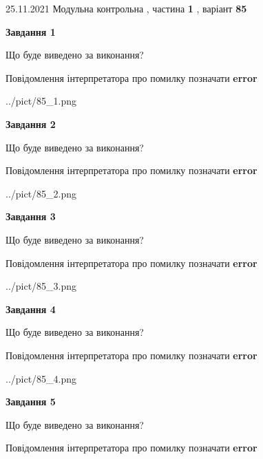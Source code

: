 \documentclass[10pt, ukrainian]{article}
\begin{document}
{25.11.2021 Модульна контрольна , частина \textbf { 1 }, варіант  \No \textbf { 85 }\par}
{
\begin {large}

{\begin {center}\textbf{Завдання 1}\end {center}}\par
Що буде виведено за виконання? \par
Повідомлення інтерпретатора про помилку позначати \textbf{error}

\begin{center}
	{../pict/85_1.png}
\end{center}
\newpage

{\begin {center}\textbf{Завдання 2}\end {center}}\par
Що буде виведено за виконання? \par
Повідомлення інтерпретатора про помилку позначати \textbf{error}

\begin{center}
	{../pict/85_2.png}
\end{center}
\newpage

{\begin {center}\textbf{Завдання 3}\end {center}}\par
Що буде виведено за виконання? \par
Повідомлення інтерпретатора про помилку позначати \textbf{error}

\begin{center}
	{../pict/85_3.png}
\end{center}
\newpage

{\begin {center}\textbf{Завдання 4}\end {center}}\par
Що буде виведено за виконання? \par
Повідомлення інтерпретатора про помилку позначати \textbf{error}

\begin{center}
	{../pict/85_4.png}
\end{center}
\newpage

{\begin {center}\textbf{Завдання 5}\end {center}}\par
Що буде виведено за виконання? \par
Повідомлення інтерпретатора про помилку позначати \textbf{error}


\end{large}}
\end{document}
